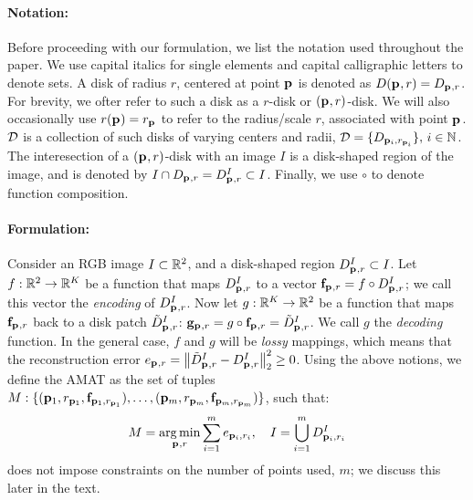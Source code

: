 \documentclass[10pt,twocolumn,letterpaper]{article}
\begin{document}
\paragraph{Notation:} Before proceeding with our formulation, we list the notation used throughout the paper.
We use capital italics for single elements and capital calligraphic letters to denote sets. A disk of radius $r$,
centered at point $\mathbf{p}_{}$ is denoted as $D(\mathbf{p}_{},r)=D_{\mathbf{p}_{},r}$. 
For brevity, we ofter refer to such a disk as a $r$-disk or $(\mathbf{p}_{},r)$-disk.
We will also occasionally use $r(\mathbf{p}_{}) = r_{\mathbf{p}_{}}$ to refer to the radius/scale $r$, associated with point $\mathbf{p}_{}$.
$\mathcal{D}$ is a collection of such disks of varying centers and radii, $\mathcal{D}=\{ D_{\mathbf{p}_{i},r_{\mathbf{p}_{i}}} \},\, i\in\mathbb{N}$.
The interesection of a $(\mathbf{p}_{},r)$-disk with an image $I$ is a disk-shaped region of the image, and is denoted by 
$I \cap D_{\mathbf{p}_{},r}=D_{\mathbf{p}_{},r}^I \subset I$. Finally, we use $\circ$ to denote function composition.

\paragraph{Formulation:} Consider an RGB image $I\subset\mathbb{R}^2$, and a disk-shaped region $D_{\mathbf{p}_{},r}^I \subset I$.
Let $f:\mathbb{R}^2 \rightarrow \mathbb{R}^K$ be a function that maps $D_{\mathbf{p}_{},r}^I$ to a vector  $\mathbf{f}_{\mathbf{p}_{},r}=f\circ D_{\mathbf{p}_{},r}^I$; 
we call this vector the \emph{encoding} of $D_{\mathbf{p}_{},r}^I$. 
Now let $g:\mathbb{R}^K \rightarrow \mathbb{R}^2$ be a function that maps $\mathbf{f}_{\mathbf{p}_{},r}$ back to a disk patch $\tilde{D}_{\mathbf{p}_{},r}^I$: 
$\mathbf{g}_{\mathbf{p}_{},r} = g \circ \mathbf{f}_{\mathbf{p}_{},r} = \tilde{D}_{\mathbf{p}_{},r}^I$. We call $g$ the \emph{decoding} function.
In the general case, $f$ and $g$ will be \emph{lossy} mappings, which means that the reconstruction error 
$e_{\mathbf{p}_{},r} = \left \lVert  \tilde{D}_{\mathbf{p}_{},r}^I - D_{\mathbf{p}_{},r}^I \right \rVert_2^2 \geq 0$. 
Using the above notions, we define the AMAT as the set of tuples 
$M:\{ ( \mathbf{p}_{1},r_{\mathbf{p}_{1}}, \mathbf{f}_{\mathbf{p}_{1},r_{\mathbf{p}_{1}}} ), \ldots, ( \mathbf{p}_{m},r_{\mathbf{p}_{m}}, \mathbf{f}_{\mathbf{p}_{m},r_{\mathbf{p}_{m}}} ) \}$, such that:
\begin{equation}
M = \operatorname*{arg\,min}_{\mathbf{p}_{},r}{\sum_{i=1}^m e_{\mathbf{p}_{i},r_i}},\quad I=\bigcup_{i=1}^m D_{\mathbf{p}_{i},r_i}^I 
\label{eq:minimization}
\end{equation}
 does not impose constraints on the number of points used, $m$;
we discuss this later in the text.
\end{document}
